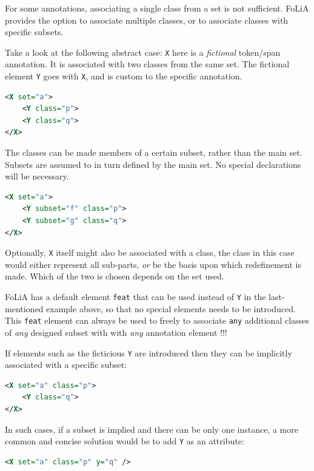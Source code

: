 \documentclass[a4paper,12pt]{report}
\begin{document}
For some annotations, associating a single class from a set is not sufficient. FoLiA provides the option to associate multiple classes, or to associate classes with specific subsets. 


Take a look at the following abstract case: \texttt{X} here is a \emph{fictional} token/span annotation. It is associated with two classes from the same set. The fictional element \texttt{Y} goes with \texttt{X}, and is custom to the specific annotation.

\begin{lstlisting}[language=xml]
<X set="a">
    <Y class="p">
    <Y class="q">
</X>
\end{lstlisting}

The classes can be made members of a certain subset, rather than the main set. Subsets are assumed to in turn defined by the main set. No special declarations will be necessary.

\begin{lstlisting}[language=xml]
<X set="a">
    <Y subset="f" class="p">
    <Y subset="g" class="q">
</X>
\end{lstlisting}

Optionally, \texttt{X} itself might also be associated with a class, the class in this case would either represent all sub-parts, \emph{or} be the basis upon which redefinement is made. Which of the two is chosen depends on the set used.

FoLiA has a default element \texttt{feat} that can be used instead of \texttt{Y} in the last-mentioned example above, so that no special elements needs to be introduced. This \texttt{feat} element can always be used to freely to associate \texttt{any} additional classes of \emph{any} designed subset with with \emph{any} annotation element !!!

If elements such as the ficticious \texttt{Y} are introduced then they can be implicitly associated with a specific subset:

\begin{lstlisting}[language=xml]
<X set="a" class="p">
    <Y class="q">
</X>
\end{lstlisting}

In such cases, if a subset is implied and there can be only one instance, a more common and concise solution would be to add \texttt{Y} as an attribute:

\begin{lstlisting}[language=xml]
<X set="a" class="p" y="q" />
\end{lstlisting}
\end{document}
